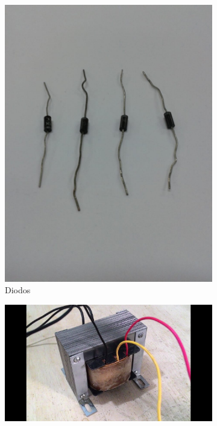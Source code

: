 \documentclass[
	12pt,				%
	openright,			%
	twoside,			%
	a4paper,			%
	article,	
	english,			%
	french,				%
	spanish,			%
	brazil				%
	]{abntex2}
\begin{document}
\begin{figure}[H]
\begin{subfigure}[H]{0.3\textwidth}
		\includegraphics[trim=5cm 10cm 5cm 10cm, clip, width=\textwidth]{1.jpeg}
		\caption{Diodos}
	\end{subfigure}
\hfill
	\begin{subfigure}[H]{0.3\textwidth}\center
		\includegraphics[trim=5cm 0 5cm 0, clip, width=\textwidth]{maxresdefault.jpg}

\end{subfigure}
\end{figure}
\end{document}
